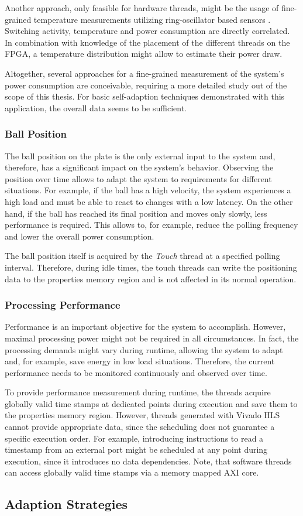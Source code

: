 Another approach, only feasible for hardware threads, might be the usage of
fine-grained temperature measurements utilizing ring-oscillator based sensors
\citep{RAH12,JJR13}. Switching activity, temperature and power consumption are
directly correlated. In combination with knowledge of the placement of the
different threads on the \ac{FPGA}, a temperature distribution might allow to
estimate their power draw.

Altogether, several approaches for a fine-grained measurement of the system's
power consumption are conceivable, requiring a more detailed study out of the
scope of this thesis. For basic self-adaption techniques demonstrated with
this application, the overall data seems to be sufficient.

\subsubsection{Ball Position}
The ball position on the plate is the only external input to the system and,
therefore, has a significant impact on the system's behavior. Observing the
position over time allows to adapt the system to requirements for different
situations. For example, if the ball has a high velocity, the system
experiences a high load and must be able to react to changes with a low
latency. On the other hand, if the ball has reached its final position and
moves only slowly, less performance is required. This allows to, for example,
reduce the polling frequency and lower the overall power consumption.

The ball position itself is acquired by the \emph{Touch} thread at a specified
polling interval. Therefore, during idle times, the touch threads can write
the positioning data to the properties memory region and is not affected in
its normal operation.

\subsubsection{Processing Performance}
Performance is an important objective for the system to accomplish. However,
maximal processing power might not be required in all circumstances. In fact,
the processing demands might vary during runtime, allowing the system to adapt
and, for example, save energy in low load situations. Therefore, the current
performance needs to be monitored continuously and observed over time.

To provide performance measurement during runtime, the threads acquire
globally valid time stamps at dedicated points during execution and save them
to the properties memory region. However, threads generated with Vivado HLS
cannot provide appropriate data, since the scheduling does not guarantee a
specific execution order. For example, introducing instructions to read a
timestamp from an external port might be scheduled at any point during
execution, since it introduces no data dependencies. Note, that software
threads can access globally valid time stamps via a memory mapped \ac{AXI}
core.

\subsection{Adaption Strategies}

